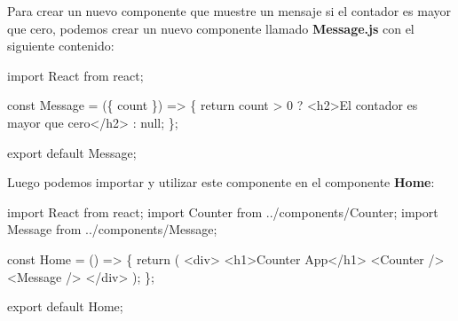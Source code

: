 \documentclass[
  a4paper,
  DIV=11,
  numbers=noendperiod,
  onepage,
  openany]{scrreprt}
\newenvironment{Shaded}{\begin{snugshade}}{\end{snugshade}}
\newcommand{\ControlFlowTok}[1]{\textcolor[rgb]{0.00,0.23,0.31}{#1}}
\newcommand{\DecValTok}[1]{\textcolor[rgb]{0.68,0.00,0.00}{#1}}
\newcommand{\FunctionTok}[1]{\textcolor[rgb]{0.28,0.35,0.67}{#1}}
\newcommand{\ImportTok}[1]{\textcolor[rgb]{0.00,0.46,0.62}{#1}}
\newcommand{\KeywordTok}[1]{\textcolor[rgb]{0.00,0.23,0.31}{#1}}
\newcommand{\NormalTok}[1]{\textcolor[rgb]{0.00,0.23,0.31}{#1}}
\newcommand{\OperatorTok}[1]{\textcolor[rgb]{0.37,0.37,0.37}{#1}}
\newcommand{\StringTok}[1]{\textcolor[rgb]{0.13,0.47,0.30}{#1}}
\begin{document}
Para crear un nuevo componente que muestre un mensaje si el contador es
mayor que cero, podemos crear un nuevo componente llamado
\textbf{Message.js} con el siguiente contenido:

\begin{Shaded}
\begin{Highlighting}[]
\ImportTok{import}\NormalTok{ React }\ImportTok{from} \StringTok{\textquotesingle{}react\textquotesingle{}}\OperatorTok{;}

\KeywordTok{const}\NormalTok{ Message }\OperatorTok{=}\NormalTok{ (\{ count \}) }\KeywordTok{=\textgreater{}}\NormalTok{ \{}
  \ControlFlowTok{return}\NormalTok{ count }\OperatorTok{\textgreater{}} \DecValTok{0} \OperatorTok{? }\KeywordTok{\textless{}h2\textgreater{}}\NormalTok{El contador es mayor que cero}\KeywordTok{\textless{}/h2\textgreater{}} \OperatorTok{:} \KeywordTok{null}\OperatorTok{;}
\NormalTok{\}}\OperatorTok{;}

\ImportTok{export} \ImportTok{default}\NormalTok{ Message}\OperatorTok{;}
\end{Highlighting}
\end{Shaded}

Luego podemos importar y utilizar este componente en el componente
\textbf{Home}:

\begin{Shaded}
\begin{Highlighting}[]
\ImportTok{import}\NormalTok{ React }\ImportTok{from} \StringTok{\textquotesingle{}react\textquotesingle{}}\OperatorTok{;}
\ImportTok{import}\NormalTok{ Counter }\ImportTok{from} \StringTok{\textquotesingle{}../components/Counter\textquotesingle{}}\OperatorTok{;}
\ImportTok{import}\NormalTok{ Message }\ImportTok{from} \StringTok{\textquotesingle{}../components/Message\textquotesingle{}}\OperatorTok{;}

\KeywordTok{const}\NormalTok{ Home }\OperatorTok{=}\NormalTok{ () }\KeywordTok{=\textgreater{}}\NormalTok{ \{}
  \ControlFlowTok{return}\NormalTok{ (}
    \KeywordTok{\textless{}div\textgreater{}}
      \KeywordTok{\textless{}h1\textgreater{}}\NormalTok{Counter App}\KeywordTok{\textless{}/h1\textgreater{}}
      \FunctionTok{\textless{}Counter} \FunctionTok{/\textgreater{}}
      \FunctionTok{\textless{}Message} \FunctionTok{/\textgreater{}}
    \KeywordTok{\textless{}/div\textgreater{}}
\NormalTok{  )}\OperatorTok{;}
\NormalTok{\}}\OperatorTok{;}

\ImportTok{export} \ImportTok{default}\NormalTok{ Home}\OperatorTok{;}
\end{Highlighting}
\end{Shaded}
\end{document}
